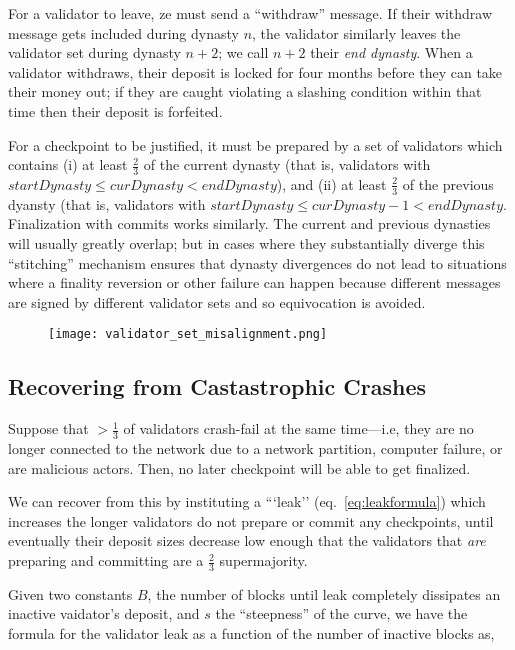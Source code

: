 \documentclass[12pt, final]{article}
\begin{document}
For a validator to leave, ze must send a ``withdraw'' message. If their withdraw message gets included during dynasty $n$, the validator similarly leaves the validator set during dynasty $n+2$; we call $n+2$ their \textit{end dynasty}. When a validator withdraws, their deposit is locked for four months  before they can take their money out; if they are caught violating a slashing condition within that time then their deposit is forfeited.

For a checkpoint to be justified, it must be prepared by a set of validators which contains (i) at least $\frac{2}{3}$ of the current dynasty (that is, validators with $startDynasty \le curDynasty < endDynasty$), and (ii) at least $\frac{2}{3}$ of the previous dyansty (that is, validators with $startDynasty \le curDynasty - 1 < endDynasty$. Finalization with commits works similarly. The current and previous dynasties will usually greatly overlap; but in cases where they substantially diverge this ``stitching'' mechanism ensures that dynasty divergences do not lead to situations where a finality reversion or other failure can happen because different messages are signed by different validator sets and so equivocation is avoided.

\begin{figure}[h!tb]
\centering
\texttt{[image: validator\_set\_misalignment.png]}
\caption{}
\label{fig:dynamic}
\end{figure}

\subsection{Recovering from Castastrophic Crashes}
\label{sect:leak}

Suppose that $>\frac{1}{3}$ of validators crash-fail at the same time---i.e, they are no longer connected to the network due to a network partition, computer failure, or are malicious actors. Then, no later checkpoint will be able to get finalized.

We can recover from this by instituting a ```leak'' (eq.~\ref{eq:leakformula}) which increases the longer validators do not prepare or commit any checkpoints, until eventually their deposit sizes decrease low enough that the validators that \textit{are} preparing and committing are a $\frac{2}{3}$ supermajority.


Given two constants $B$, the number of blocks until leak completely dissipates an inactive vaidator's deposit, and $s$ the ``steepness'' of the curve, we have the formula for the validator leak as a function of the number of inactive blocks as,
\end{document}
